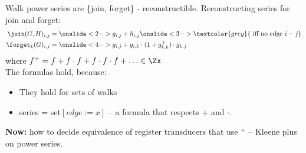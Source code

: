\fi
\begin{frame}{Walk power series are \{join, forget\} - reconstructible.}
Reconstructing series for join and forget:
\begin{align*}
\join(G,H)_{i,j}& = \onslide<2->{g_{i,j} + h_{i,j}} \onslide<3->{\textcolor{grey}{\text{ iff no edge }i-j}}\\
\forget_k(G)_{i,j} &= \onslide<4->{g_{i,j} + g_{i,k}\cdot(1 + g_{k,k}^+)\cdot g_{k,j}}
\end{align*}
\pause \pause \pause
where $f^+ = f + f\cdot f + f\cdot f \cdot f + \ldots \in \Zx$
\\
\pause 
The formulas hold, because:\\
\pause
\begin{itemize}[<+->]
	\item They hold for sets of walks
	\item series = set$[edge:=x]$ -- a formula that respects $+$ and $\cdot$.
\end{itemize}
\pause
\textbf{Now: } how to decide equivalence of register transducers that use $^+$ -- Kleene plus on power series.

\end{frame}

